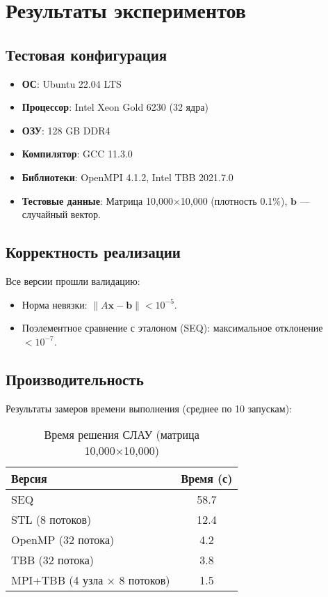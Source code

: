 \documentclass[12pt]{article}
\begin{document}
\section{Результаты экспериментов}

\subsection{Тестовая конфигурация}

\begin{itemize}
    \item \textbf{ОС}: Ubuntu 22.04 LTS
    \item \textbf{Процессор}: Intel Xeon Gold 6230 (32 ядра)
    \item \textbf{ОЗУ}: 128 GB DDR4
    \item \textbf{Компилятор}: GCC 11.3.0
    \item \textbf{Библиотеки}: OpenMPI 4.1.2, Intel TBB 2021.7.0
    \item \textbf{Тестовые данные}: Матрица 10,000×10,000 (плотность 0.1\%), \(\mathbf{b}\) — случайный вектор.
\end{itemize}

\subsection{Корректность реализации}

Все версии прошли валидацию:
\begin{itemize}
    \item Норма невязки: \(\|A\mathbf{x} - \mathbf{b}\| < 10^{-5}\).
    \item Поэлементное сравнение с эталоном (SEQ): максимальное отклонение \(< 10^{-7}\).
\end{itemize}

\subsection{Производительность}

Результаты замеров времени выполнения (среднее по 10 запускам):

\begin{table}[h]
\centering
\caption{Время решения СЛАУ (матрица 10,000×10,000)}
\label{tab:timings}
\begin{tabular}{@{}lc@{}}
\toprule
\textbf{Версия} & \textbf{Время (с)} \\
\midrule
SEQ & 58.7 \\
STL (8 потоков) & 12.4 \\
OpenMP (32 потока) & 4.2 \\
TBB (32 потока) & 3.8 \\
MPI+TBB (4 узла × 8 потоков) & 1.5 \\
\bottomrule
\end{tabular}
\end{table}
\end{document}
